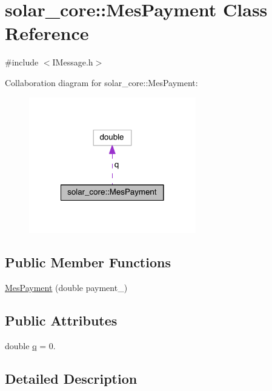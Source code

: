 \hypertarget{classsolar__core_1_1_mes_payment}{}\section{solar\+\_\+core\+:\+:Mes\+Payment Class Reference}
\label{classsolar__core_1_1_mes_payment}


{\ttfamily \#include $<$I\+Message.\+h$>$}



Collaboration diagram for solar\+\_\+core\+:\+:Mes\+Payment\+:\nopagebreak
\begin{figure}[H]
\begin{center}
\leavevmode
\includegraphics[width=206pt]{classsolar__core_1_1_mes_payment__coll__graph}
\end{center}
\end{figure}
\subsection*{Public Member Functions}
\begin{DoxyCompactItemize}
\item 
\hyperlink{classsolar__core_1_1_mes_payment_a1f1892acd5c8da372d061a69445d68bd}{Mes\+Payment} (double payment\+\_\+)
\end{DoxyCompactItemize}
\subsection*{Public Attributes}
\begin{DoxyCompactItemize}
\item 
double \hyperlink{classsolar__core_1_1_mes_payment_a5d137def5ff6f3659650c08f90d07ca2}{q} = 0.
\end{DoxyCompactItemize}


\subsection{Detailed Description}


